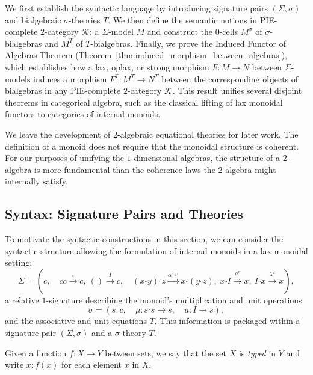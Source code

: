 \documentclass[11pt]{article}
\theoremstyle{plain}
\theoremstyle{definition}
\numberwithin{equation}{section}
\newcommand{\K}{\mathcal{K}}
\begin{document}
We first establish the syntactic language by introducing signature pairs $(\Sigma,\sigma)$ and bialgebraic $\sigma$-theories $T$. We then define the semantic notions in PIE-complete $2$-category $\K$: a $\Sigma$-model $M$ and construct the $0$-cells $M^\sigma$ of $\sigma$-bialgebras and $M^T$ of $T$-bialgebras. Finally, we prove the Induced Functor of Algebras Theorem (Theorem~\ref{thm:induced_morphism_between_algebras}), which establishes how a lax, oplax, or strong morphism $F\colon M\to N$ between $\Sigma$-models induces a morphism $F^T\colon M^T\to N^T$ between the corresponding objects of bialgebras in any PIE-complete $2$-category $\K$. This result unifies several disjoint theorems in categorical algebra, such as the classical lifting of lax monoidal functors to categories of internal monoids.

We leave the development of $2$-algebraic equational theories for later work. The definition of a monoid does not require that the monoidal structure is coherent. For our purposes of unifying the $1$-dimensional algebras, the structure of a $2$-algebra is more fundamental than the coherence laws the $2$-algebra might internally satisfy.

\subsection{Syntax: Signature Pairs and Theories}
To motivate the syntactic constructions in this section, we can consider the syntactic structure allowing the formulation of internal monoids in a lax monoidal setting:
$$
\Sigma = (c, \quad cc\xrightarrow{\square} c,\ ()\xrightarrow{I} c, \quad (x\square y)\square z\xrightarrow{\alpha^{xyz}}x\square (y\square z),\ x\square I\xrightarrow{\rho^x} x,\ I\square x\xrightarrow{\lambda^x} x),
$$
a relative $1$-signature describing the monoid's multiplication and unit operations
\[
\sigma = (s\colon c, \quad \mu\colon s\square s\to s, \quad u\colon I\to s),
\]
and the associative and unit equations $T$. This information is packaged within a signature pair $(\Sigma,\sigma)$ and a $\sigma$-theory $T$.

Given a function $f \colon X \to Y$ between sets, we say that the set $X$ is \emph{typed} in $Y$ and write $x \colon f(x)$ for each element $x$ in $X$.
\end{document}
